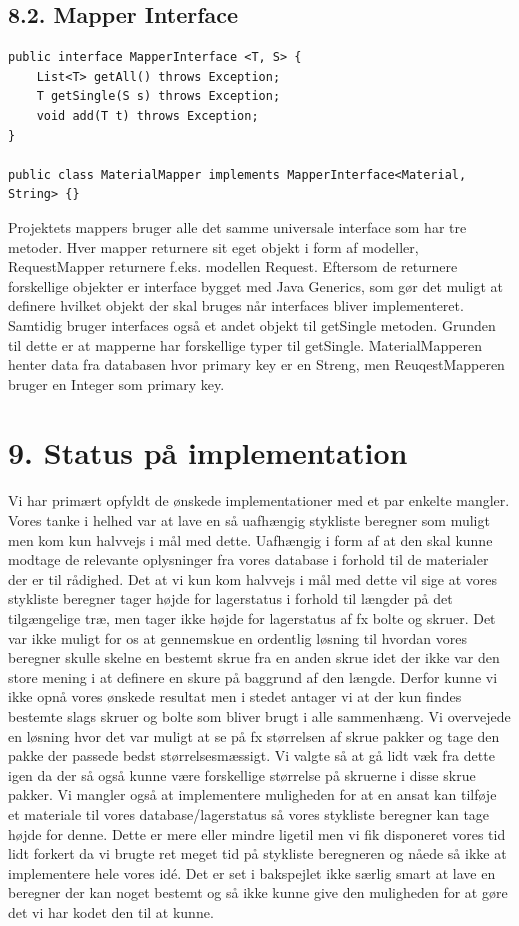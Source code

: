 \documentclass[11pt]{report}
\begin{document}
\section*{8.2. Mapper Interface}
\begin{lstlisting}
public interface MapperInterface <T, S> {
    List<T> getAll() throws Exception;
    T getSingle(S s) throws Exception;
    void add(T t) throws Exception;
}

public class MaterialMapper implements MapperInterface<Material, String> {}
\end{lstlisting}
Projektets mappers bruger alle det samme universale interface som har tre metoder. Hver mapper returnere sit eget objekt i form af modeller, RequestMapper returnere f.eks. modellen Request. Eftersom de returnere forskellige objekter er interface bygget med Java Generics, som gør det muligt at definere hvilket objekt der skal bruges når interfaces bliver implementeret. Samtidig bruger interfaces også et andet objekt til getSingle metoden. Grunden til dette er at mapperne har forskellige typer til getSingle. MaterialMapperen henter data fra databasen hvor primary key er en Streng, men ReuqestMapperen bruger en Integer som primary key.
\newpage
\chapter*{9. Status på implementation}
Vi har primært opfyldt de ønskede implementationer med et par enkelte mangler. Vores tanke i helhed var at lave en så uafhængig stykliste beregner som muligt men kom kun halvvejs i mål med dette. Uafhængig i form af at den skal kunne modtage de relevante oplysninger fra vores database i forhold til de materialer der er til rådighed. Det at vi kun kom halvvejs i mål med dette vil sige at vores stykliste beregner tager højde for lagerstatus i forhold til længder på det tilgængelige træ, men tager ikke højde for lagerstatus af fx bolte og skruer. Det var ikke muligt for os at gennemskue en ordentlig løsning til hvordan vores beregner skulle skelne en bestemt skrue fra en anden skrue idet der ikke var den store mening i at definere en skure på baggrund af den længde. Derfor kunne vi ikke opnå vores ønskede resultat men i stedet antager vi at der kun findes bestemte slags skruer og bolte som bliver brugt i alle sammenhæng. Vi overvejede en løsning hvor det var muligt at se på fx størrelsen af skrue pakker og tage den pakke der passede bedst størrelsesmæssigt. Vi valgte så at gå lidt væk fra dette igen da der så også kunne være forskellige størrelse på skruerne i disse skrue pakker. Vi mangler også at implementere muligheden for at en ansat kan tilføje et materiale til vores database/lagerstatus så vores stykliste beregner kan tage højde for denne. Dette er mere eller mindre ligetil men vi fik disponeret vores tid lidt forkert da vi brugte ret meget tid på stykliste beregneren og nåede så ikke at implementere hele vores idé. Det er set i bakspejlet ikke særlig smart at lave en beregner der kan noget bestemt og så ikke kunne give den muligheden for at gøre det vi har kodet den til at kunne.
\end{document}
